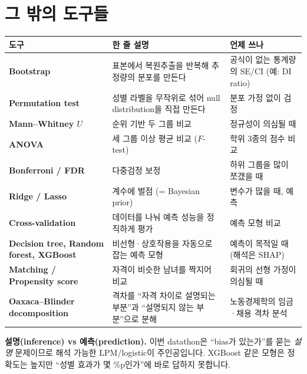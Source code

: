 \documentclass[11pt,a4paper]{article}
\newcommand{\term}[1]{\textbf{#1}}
\begin{document}
\section{그 밖의 도구들}
\begin{center}
\begin{tabular}{@{}p{3.6cm} p{6.4cm} p{4.4cm}@{}}
\toprule
도구 & 한 줄 설명 & 언제 쓰나 \\
\midrule
\term{Bootstrap} & 표본에서 복원추출을 반복해 추정량의 분포를 만든다 & 공식이 없는 통계량의 SE/CI (예: DI ratio) \\
\term{Permutation test} & 성별 라벨을 무작위로 섞어 null distribution을 직접 만든다 & 분포 가정 없이 검정 \\
\term{Mann–Whitney $U$} & 순위 기반 두 그룹 비교 & 정규성이 의심될 때 \\
\term{ANOVA} & 세 그룹 이상 평균 비교 ($F$-test) & 학위 3종의 점수 비교 \\
\term{Bonferroni / FDR} & 다중검정 보정 & 하위 그룹을 많이 쪼갰을 때 \\
\term{Ridge / Lasso} & 계수에 벌점 (= Bayesian prior) & 변수가 많을 때, 예측 \\
\term{Cross-validation} & 데이터를 나눠 예측 성능을 정직하게 평가 & 예측 모형 비교 \\
\term{Decision tree, Random forest, XGBoost} & 비선형·상호작용을 자동으로 잡는 예측 모형 & 예측이 목적일 때 (해석은 SHAP) \\
\term{Matching / Propensity score} & 자격이 비슷한 남녀를 짝지어 비교 & 회귀의 선형 가정이 의심될 때 \\
\term{Oaxaca–Blinder decomposition} & 격차를 ``자격 차이로 설명되는 부분''과 ``설명되지 않는 부분''으로 분해 & 노동경제학의 임금·채용 격차 분석 \\
\bottomrule
\end{tabular}
\end{center}

\textbf{설명(inference) vs 예측(prediction).} 이번 datathon은 ``bias가 있는가''를 묻는 \emph{설명} 문제이므로 해석 가능한 LPM/logistic이 주인공입니다. XGBoost 같은 모형은 정확도는 높지만 ``성별 효과가 몇 \%p인가''에 바로 답하지 못합니다.

\end{document}
